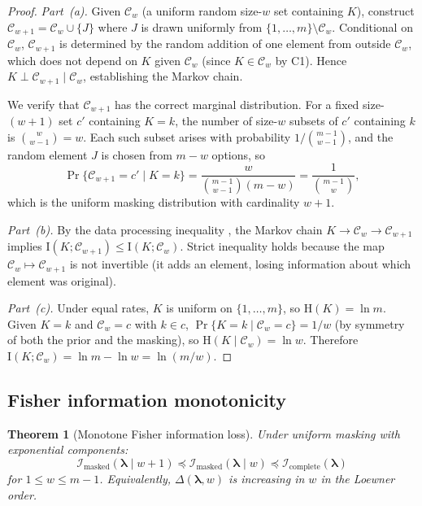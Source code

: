 \documentclass[11pt]{article}
\theoremstyle{definition}
\theoremstyle{plain}
\newtheorem{theorem}{Theorem}
\renewcommand{\v}[1]{\boldsymbol{#1}}
\newcommand{\Loewner}{\preceq}
\newcommand{\FI}{\mathcal{I}}       %
\newcommand{\MI}{\mathrm{I}}        %
\newcommand{\Ent}{\mathrm{H}}       %
\begin{document}
\begin{proof}
\emph{Part~(a).}
Given $\mathcal{C}_w$ (a uniform random size-$w$ set containing $K$),
construct $\mathcal{C}_{w+1} = \mathcal{C}_w \cup \{J\}$ where $J$
is drawn uniformly from $\{1, \ldots, m\} \setminus \mathcal{C}_w$.
Conditional on $\mathcal{C}_w$, $\mathcal{C}_{w+1}$ is determined by
the random addition of one element from outside $\mathcal{C}_w$, which
does not depend on $K$ given $\mathcal{C}_w$ (since $K \in \mathcal{C}_w$
by C1).
Hence $K \perp \mathcal{C}_{w+1} \mid \mathcal{C}_w$, establishing
the Markov chain.

We verify that $\mathcal{C}_{w+1}$ has the correct marginal
distribution.
For a fixed size-$(w+1)$ set $c'$ containing $K = k$, the number
of size-$w$ subsets of $c'$ containing $k$ is $\binom{w}{w-1} = w$.
Each such subset arises with probability $1/\binom{m-1}{w-1}$, and
the random element $J$ is chosen from $m - w$ options, so
\begin{equation}
    \Pr\{\mathcal{C}_{w+1} = c' \mid K = k\}
    = \frac{w}{\binom{m-1}{w-1}(m-w)}
    = \frac{1}{\binom{m-1}{w}},
\end{equation}
which is the uniform masking distribution with cardinality $w+1$.

\emph{Part~(b).}
By the data processing inequality
\citep{coverandthomas2006}, the Markov chain
$K \to \mathcal{C}_w \to \mathcal{C}_{w+1}$ implies
$\MI(K; \mathcal{C}_{w+1}) \leq \MI(K; \mathcal{C}_w)$.
Strict inequality holds because the map
$\mathcal{C}_w \mapsto \mathcal{C}_{w+1}$ is not invertible (it
adds an element, losing information about which element was original).

\emph{Part~(c).}
Under equal rates, $K$ is uniform on $\{1, \ldots, m\}$, so
$\Ent(K) = \ln m$.
Given $K = k$ and $\mathcal{C}_w = c$ with $k \in c$,
$\Pr\{K = k \mid \mathcal{C}_w = c\} = 1/w$ (by symmetry of both
the prior and the masking), so $\Ent(K \mid \mathcal{C}_w) = \ln w$.
Therefore $\MI(K; \mathcal{C}_w) = \ln m - \ln w = \ln(m/w)$.
\end{proof}

\subsection{Fisher information monotonicity}

\begin{theorem}[Monotone Fisher information loss]
\label{thm:fi-monotone}
Under uniform masking with exponential components:
\begin{equation}
    \FI_{\mathrm{masked}}(\v{\lambda} \mid w+1)
    \Loewner
    \FI_{\mathrm{masked}}(\v{\lambda} \mid w)
    \Loewner
    \FI_{\mathrm{complete}}(\v{\lambda})
\end{equation}
for $1 \leq w \leq m - 1$.
Equivalently, $\Delta(\v{\lambda}, w)$ is increasing in $w$ in the
Loewner order.
\end{theorem}
\end{document}

